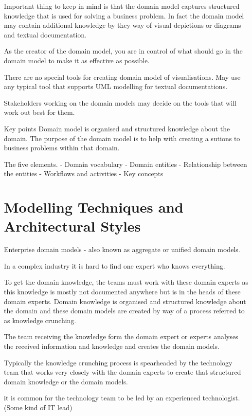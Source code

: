 \documentclass[a4paper, 11pt]{book}
\begin{document}
    Important thing to keep in mind is that the domain model captures structured knowledge that is used for solving a business problem.
    In fact the domain model may contain additional knowledge by they way of visual depictions or diagrams and textual documentation.

    As the creator of the domain model, you are in control of what should go in the domain model to make it as effective as possible.

    There are no special tools for creating domain model of visualisations.
    May use any typical tool that supports UML modelling for textual documentations.

    Stakeholders working on the domain models may decide on the tools that will work out best for them.

    Key points
    Domain model is organised and structured knowledge about the domain.
    The purpose of the domain model is to help with creating a sutions to business problems within that domain.

    The five elements.
    - Domain vocabulary
    - Domain entities
    - Relationship between the entities
    - Workflows and activities
    - Key concepts


    \section{Modelling Techniques and Architectural Styles}
    Enterprise domain models - also known as aggregate or unified domain models.

    In a complex industry it is hard to find one expert who knows everything.

    To get the domain knowledge, the teams must work with these domain experts as this knowledge is mostly not documented anywhere but is in the heads of these domain experts.
    Domain knowledge is organised and structured knowledge about the domain and these domain models are created by way of a process referred to as knowledge crunching.

    The team receiving the knowledge form the domain expert or experts analyses the received information and knowledge and creates the domain models.

    Typically the knowledge crunching process is spearheaded by the technology team that works very closely with the domain experts to create that structured domain knowledge or the domain models.

    it is common for the technology team to be led by an experienced technologist. (Some kind of IT lead)
\end{document}
